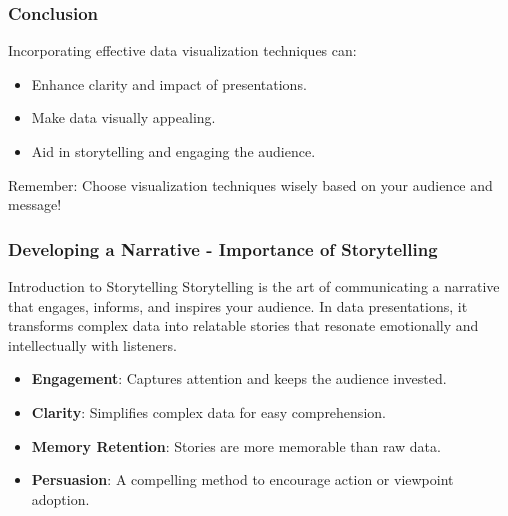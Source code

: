 \documentclass[aspectratio=169]{beamer}
\begin{document}
\begin{frame}[fragile]
    \frametitle{Conclusion}
    Incorporating effective data visualization techniques can:
    \begin{itemize}
        \item Enhance clarity and impact of presentations.
        \item Make data visually appealing.
        \item Aid in storytelling and engaging the audience.
    \end{itemize}
    \newline
    Remember: Choose visualization techniques wisely based on your audience and message!
\end{frame}

\begin{frame}[fragile]
  \frametitle{Developing a Narrative - Importance of Storytelling}
  \begin{block}{Introduction to Storytelling}
    Storytelling is the art of communicating a narrative that engages, informs, and inspires your audience. In data presentations, it transforms complex data into relatable stories that resonate emotionally and intellectually with listeners.
  \end{block}
  
  \begin{itemize}
    \item \textbf{Engagement}: Captures attention and keeps the audience invested.
    \item \textbf{Clarity}: Simplifies complex data for easy comprehension.
    \item \textbf{Memory Retention}: Stories are more memorable than raw data.
    \item \textbf{Persuasion}: A compelling method to encourage action or viewpoint adoption.
  \end{itemize}
\end{frame}
\end{document}
